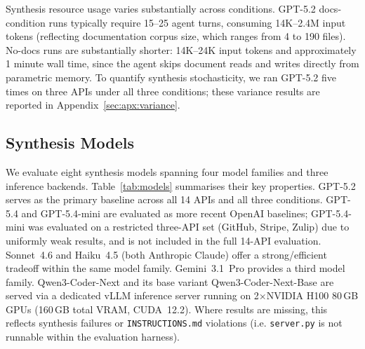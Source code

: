 \noindent
Synthesis resource usage varies substantially across conditions. GPT-5.2 docs-condition runs typically require 15--25 agent turns, consuming 14K--2.4M input tokens (reflecting documentation corpus size, which ranges from 4 to 190 files). No-docs runs are substantially shorter: 14K--24K input tokens and approximately 1 minute wall time, since the agent skips document reads and writes directly from parametric memory. To quantify synthesis stochasticity, we ran GPT-5.2 five times on three APIs under all three conditions; these variance results are reported in Appendix~\ref{sec:apx:variance}.

\subsection{Synthesis Models}

We evaluate eight synthesis models spanning four model families and three
inference backends. Table~\ref{tab:models} summarises their key properties.
GPT-5.2 serves as the primary baseline across all 14 APIs and all three conditions.
GPT-5.4 and GPT-5.4-mini are evaluated as more recent OpenAI baselines; GPT-5.4-mini was evaluated on a restricted three-API set (GitHub, Stripe, Zulip) due to uniformly weak results, and is not included in the full 14-API evaluation. Sonnet~4.6 and Haiku~4.5 (both Anthropic Claude) offer a strong/efficient tradeoff within the same model family. Gemini~3.1~Pro provides a third model family. Qwen3-Coder-Next and its base variant Qwen3-Coder-Next-Base are
served via a dedicated vLLM inference server running on 2$\times$NVIDIA H100
80\,GB GPUs (160\,GB total VRAM, CUDA~12.2). Where results are missing, this reflects synthesis failures or \texttt{INSTRUCTIONS.md} violations (i.e. \texttt{server.py} is not runnable within the evaluation harness). 


